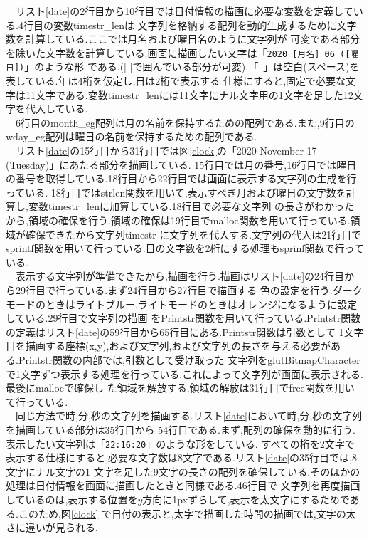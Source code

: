 \documentclass[a4j]{jarticle}
\begin{document}
    　リスト\ref{date}の2行目から10行目では日付情報の描画に必要な変数を定義している.4行目の変数timestr\_lenは
    文字列を格納する配列を動的生成するために文字数を計算している.ここでは月名および曜日名のように文字列が
    可変である部分を除いた文字数を計算している.画面に描画したい文字は「\verb*|2020 [月名] 06 ([曜日])|」のような形
    である.([ ]で囲んでいる部分が可変).「\verb*| |」は空白(スペース)を表している.年は4桁を仮定し,日は2桁で表示する
    仕様にすると,固定で必要な文字は11文字である.変数timestr\_lenには11文字にナル文字用の1文字を足した12文字を代入している.\\
    　6行目のmonth\_eg配列は月の名前を保持するための配列である.また,9行目のwday\_eg配列は曜日の名前を保持するための配列である.\\
    　リスト\ref{date}の15行目から31行目では図\ref{clock}の「2020 November 17 (Tuesday)」にあたる部分を描画している.
    15行目では月の番号,16行目では曜日の番号を取得している.18行目から22行目では画面に表示する文字列の生成を行っている.
    18行目ではstrlen関数を用いて,表示すべき月および曜日の文字数を計算し,変数timestr\_lenに加算している.18行目で必要な文字列
    の長さがわかったから,領域の確保を行う.領域の確保は19行目でmalloc関数を用いて行っている.領域が確保できたから文字列timestr
    に文字列を代入する.文字列の代入は21行目でsprintf関数を用いて行っている.日の文字数を2桁にする処理もsprinf関数で行っている.\\
    　表示する文字列が準備できたから,描画を行う.描画はリスト\ref{date}の24行目から29行目で行っている.まず24行目から27行目で描画する
    色の設定を行う.ダークモードのときはライトブルー,ライトモードのときはオレンジになるように設定している.29行目で文字列の描画
    をPrintstr関数を用いて行っている.Printstr関数の定義はリスト\ref{date}の59行目から65行目にある.Printstr関数は引数として
    1文字目を描画する座標(x,y),および文字列,および文字列の長さを与える必要がある.Printstr関数の内部では,引数として受け取った
    文字列をglutBitmapCharacterで1文字ずつ表示する処理を行っている.これによって文字列が画面に表示される.最後にmallocで確保し
    た領域を解放する.領域の解放は31行目でfree関数を用いて行っている.\\
    　同じ方法で時,分,秒の文字列を描画する.リスト\ref{date}において時,分,秒の文字列を描画している部分は35行目から
    54行目である.まず,配列の確保を動的に行う.表示したい文字列は「\verb*|22:16:20|」のような形をしている.
    すべての桁を2文字で表示する仕様にすると,必要な文字数は8文字である.リスト\ref{date}の35行目では,8文字にナル文字の1
    文字を足した9文字の長さの配列を確保している.そのほかの処理は日付情報を画面に描画したときと同様である.46行目で
    文字列を再度描画しているのは,表示する位置を$y$方向に1pxずらして,表示を太文字にするためである.このため,図\ref{clock}
    で日付の表示と,太字で描画した時間の描画では,文字の太さに違いが見られる.
    　
\end{document}
